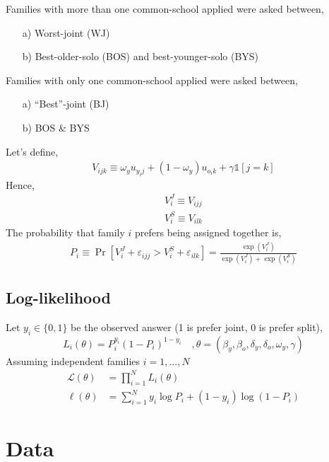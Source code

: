\documentclass{article}
\begin{document}
Families with more than one common-school applied were asked between,
\begin{enumerate}
    \item[a)] Worst-joint (WJ)
    \item [b)] Best-older-solo (BOS) and best-younger-solo (BYS)
\end{enumerate}
Families with only one common-school applied were asked between,
\begin{enumerate}
    \item [a)] ``Best''-joint (BJ)
    \item [b)] BOS \& BYS
\end{enumerate}

Let's define, 
\begin{align*}
    V_{ijk} \equiv \omega_{y} u_{y_ij} + (1-\omega_{y})u_{o_ik} + \gamma \mathds{1}[j = k]
\end{align*}
Hence,
\begin{align*}
    V_i^J \equiv V_{ijj} \tag{Assigned together} \\
    V_i^S \equiv V_{ilk} \tag{Split assignment}
\end{align*}
The probability that family $i$ prefers being assigned together is,
\begin{align*}
    P_i \equiv \Pr \left[ V_i^J + \varepsilon_{ijj} > V_i^S + \varepsilon_{ilk}  \right] = \frac{\exp\left(V_i^J\right)}{\exp\left(V_i^J\right) + \exp\left(V_i^S\right)}
\end{align*}

\subsection{Log-likelihood}
Let \(y_i \in \{0,1 \} \) be the observed answer (1 is prefer joint, 0 is prefer split),
\[
L_i (\theta) = P_i^{y_i} (1-P_i)^{1-y_i} \quad, \theta = (\beta_y,\beta_o,\delta_y,\delta_o,\omega_y, \gamma)
\]
Assuming independent families \(i = 1,...,N\)
\begin{align*}
    \mathcal{L}(\theta) &= \prod^N_{i=1}L_i(\theta) \\
    \ell(\theta) &= \sum_{i=1}^N y_i \log P_i + (1-y_i) \log (1-P_i)
\end{align*}

\section{Data}
\end{document}
